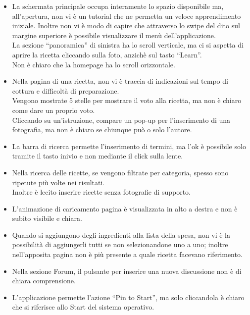 \begin{itemize}
\item La schermata principale occupa interamente lo spazio disponibile ma, all'apertura, non vi è un tutorial che ne permetta un veloce apprendimento iniziale. Inoltre non vi è modo di capire che attraverso lo swipe del dito sul margine superiore è possibile visualizzare il menù dell'applicazione.\\La sezione ``panoramica'' di sinistra ha lo scroll verticale, ma ci si aspetta di aprire la ricetta cliccando sulla foto, anzichè sul tasto ``Learn''.\\Non è chiaro che la homepage ha lo scroll orizzontale.

\item Nella pagina di una ricetta, non vi è traccia di indicazioni sul tempo di cottura e difficoltà di preparazione.\\
Vengono mostrate 5 stelle per mostrare il voto alla ricetta, ma non è chiaro come dare un proprio voto.\\
Cliccando su un'istruzione, compare un pop-up per l'inserimento di una fotografia, ma non è chiaro se chiunque può o solo l'autore.\\

\item La barra di ricerca permette l'inserimento di termini, ma l'ok è possibile solo tramite il tasto inivio e non mediante il click sulla lente.

\item Nella ricerca delle ricette, se vengono filtrate per categoria, spesso sono ripetute più volte nei risultati.\\Inoltre è lecito inserire ricette senza fotografie di supporto.

\item L'animazione di caricamento pagina è visualizzata in alto a destra e non è subito visibile e chiara.

\item Quando si aggiungono degli ingredienti alla lista della spesa, non vi è la possibilità di aggiungerli tutti se non selezionandone uno a uno; inoltre nell'apposita pagina non è più presente a quale ricetta facevano riferimento.

\item Nella sezione Forum, il pulsante per inserire una nuova discussione non è di chiara comprensione.

\item L'applicazione permette l'azione ``Pin to Start'', ma solo cliccandola è chiaro che si riferisce allo Start del sistema operativo.

\end{itemize}

